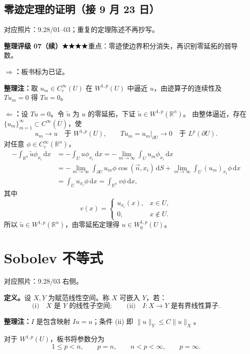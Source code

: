 \documentclass[UTF8,a4paper,11pt,fontset=fandol]{ctexart}
\newcommand{\R}{\mathbb R}
\newcommand{\dd}{\,\mathrm d}
\newcommand{\ednote}[1]{\par{\small\color{notegray}\textbf{整理注：}#1}\par}
\newcommand{\source}[1]{{\small\color{notegray}对应照片：#1。}\par}
\newcommand{\proofstars}[1]{\ensuremath{%
\ifnum#1>0\relax\bigstar\fi
\ifnum#1>1\relax\bigstar\fi
\ifnum#1>2\relax\bigstar\fi
\ifnum#1>3\relax\bigstar\fi
\ifnum#1>4\relax\bigstar\fi}}
\newcommand{\proofrating}[3]{\par{\small\color{proofblue}%
\textbf{整理评级 #1}\enspace\proofstars{#2}\quad #3\par}}
\begin{document}
\subsection*{零迹定理的证明（接 9 月 23 日）}
\source{9.28/01--03；重复的定理陈述不再抄写}
\proofrating{07（续）}{4}{重点：零迹使边界积分消失，再识别零延拓的弱导数。}
\textbf{$\Longrightarrow$：}板书标为已证。
\ednote{取 $u_m\in C_c^\infty(U)$ 在 $W^{1,p}(U)$ 中逼近 $u$，由迹算子的连续性及 $Tu_m=0$ 得 $Tu=0$。}
\textbf{$\Longleftarrow$：}设 $Tu=0$。令 $\widetilde u$ 为 $u$ 的零延拓，下证
$\widetilde u\in W^{1,p}(\R^n)$。
由整体逼近，存在 $\{u_m\}_{m=1}^\infty\subset C^\infty(\overline U)$，使
\[
u_m\to u\quad\text{于 }W^{1,p}(U),\qquad
Tu_m=u_m|_{\partial U}\to0\quad\text{于 }L^p(\partial U).
\]
对任意 $\phi\in C_c^\infty(\R^n)$，
\[
\begin{aligned}
-\int_{\R^n}\widetilde u\phi_{x_i}\dd x
&=-\int_Uu\phi_{x_i}\dd x
=-\lim_{m\to\infty}\int_Uu_m\phi_{x_i}\dd x\\
&=-\lim_{m\to\infty}\int_{\partial U}u_m\phi\cos(\vec n,x_i)\dd S
+\lim_{m\to\infty}\int_U(u_m)_{x_i}\phi\dd x\\
&=\int_Uu_{x_i}\phi\dd x=\int_{\R^n}v\phi\dd x,
\end{aligned}
\]
其中
\[
v(x)=\begin{cases}u_{x_i}(x),&x\in U,\\0,&x\notin U.\end{cases}
\]
所以 $\widetilde u\in W^{1,p}(\R^n)$，由零延拓定理得 $u\in W_0^{1,p}(U)$。

\section{Sobolev 不等式}
\source{9.28/03 右侧}
\textbf{定义。}设 $X,Y$ 为赋范线性空间。称 $X$ 可嵌入 $Y$，若：
\[
\text{(i)}\quad X\text{ 是 }Y\text{ 的线性子空间};\qquad
\text{(ii)}\quad I:X\to Y\text{ 是有界线性算子}.
\]
\ednote{$I$ 是包含映射 $Iu=u$；条件 (ii) 即 $\|u\|_Y\leq C\|u\|_X$。}
对于 $W^{1,p}(U)$，板书将参数分为
\[
1\leq p<n,\qquad p=n,\qquad n<p<\infty,\qquad p=\infty.
\]

\newpage
\end{document}
